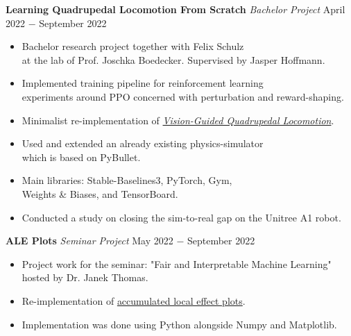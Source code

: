 \documentclass{article}
\begin{document}
\noindent \textbf{Learning Quadrupedal Locomotion From Scratch} \textit{Bachelor Project} \href{https://github.com/feinran/locomotion_simulation}{\faGithubSquare}\hfill  April 2022 $-$ September 2022
\begin{itemize}[noitemsep,nolistsep,leftmargin=*]
    \item Bachelor research project together with Felix Schulz \\ at the lab of Prof. Joschka Boedecker. Supervised by Jasper Hoffmann.
    \item Implemented training pipeline for reinforcement learning \\ 
    experiments around PPO concerned with perturbation and reward-shaping.
    \item Minimalist re-implementation of \href{https://arxiv.org/abs/2109.14549}{\textit{Vision-Guided Quadrupedal Locomotion}}.
    \item Used and extended an already existing physics-simulator \\ 
    which is based on PyBullet.
    \item Main libraries: Stable-Baselines3, PyTorch, Gym, \\ Weights \& Biases, and TensorBoard.
    \item Conducted a study on closing the sim-to-real gap on the Unitree A1 robot. \\
\end{itemize}


\noindent \textbf{ALE Plots} \textit{Seminar Project} \href{https://github.com/RobinU434/AccumulatedLocalEffectPlots}{\faGithubSquare} \hfill  May 2022 $-$ September 2022
\begin{itemize}[noitemsep,nolistsep,leftmargin=*]
    \item Project work for the seminar: "Fair and Interpretable Machine Learning" \\ 
    hosted by Dr. Janek Thomas.
    \item Re-implementation of \href{https://academic.oup.com/jrsssb/article/82/4/1059/7056085}{accumulated local effect plots}.
    \item Implementation was done using Python alongside Numpy and Matplotlib. \\
\end{itemize}
\end{document}
